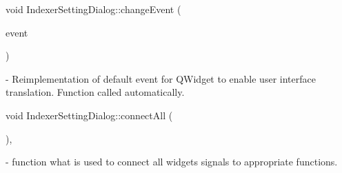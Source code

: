 \mbox{\label{classIndexerSettingDialog_a2140c46d3d12396442388a3c42ba8e83}} 
{\footnotesize\ttfamily void Indexer\+Setting\+Dialog\+::\texorpdfstring{change\+Event}{changeEvent} (\begin{DoxyParamCaption}\item[{Q\+Event $\ast$}]{event }\end{DoxyParamCaption}){\ttfamily [protected]}}- Reimplementation of default event for Q\+Widget to enable user interface translation. Function called automatically.

\mbox{\label{classIndexerSettingDialog_a4d7f2f508e87ac980d21557f5a18a216}} 
{\footnotesize\ttfamily void Indexer\+Setting\+Dialog\+::\texorpdfstring{connect\+All}{connectAll} (\begin{DoxyParamCaption}{ }\end{DoxyParamCaption}){\ttfamily [private]}, {\ttfamily [slot]}} - function what is used to connect all widgets signals to appropriate functions.

